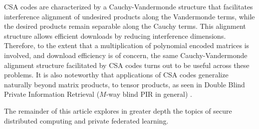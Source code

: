 CSA codes are characterized by a Cauchy-Vandermonde structure that facilitates interference alignment of undesired products along the Vandermonde terms, while the desired products remain separable along the Cauchy terms. This alignment structure allows efficient downloads by reducing interference dimensions. Therefore, to the extent that a multiplication of polynomial encoded matrices is involved, and download efficiency is of concern, the same Cauchy-Vandermonde alignment structure facilitated by CSA codes turns out to be useful across these problems. It is also noteworthy that applications of CSA codes generalize naturally beyond matrix products, to tensor products, as seen in Double Blind Private Information Retrieval ($M$-way blind PIR in general) \cite{Lu_Jia_Jafar_DBTPIR}. 


The remainder of this article explores in greater depth the topics of secure distributed computing and private federated learning.